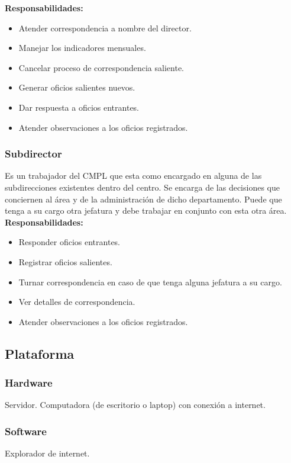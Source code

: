 \textbf{Responsabilidades:}
\begin{itemize}
	\item Atender correspondencia a nombre del director.
	\item Manejar los indicadores mensuales.
	\item Cancelar proceso de correspondencia saliente.
	\item Generar oficios salientes nuevos.
	\item Dar respuesta a oficios entrantes.
	\item Atender observaciones a los oficios registrados.
\end{itemize}

\subsubsection{Subdirector}
Es un trabajador del CMPL que esta como encargado en alguna de las subdirecciones existentes dentro del centro. Se encarga de las decisiones que conciernen al área y de la administración de dicho departamento. Puede que tenga a su cargo otra jefatura y debe trabajar en conjunto con esta otra área.\\ 

\textbf{Responsabilidades:}
\begin{itemize}
	\item Responder oficios entrantes.
	\item Registrar oficios salientes.
	\item Turnar correspondencia en caso de que tenga alguna jefatura a su cargo.
	\item Ver detalles de correspondencia.
	\item Atender observaciones a los oficios registrados.
\end{itemize}

\subsection{Plataforma}

\subsubsection{Hardware}
Servidor.
Computadora (de escritorio o laptop) con conexión a internet.

\subsubsection{Software}
Explorador de internet.

